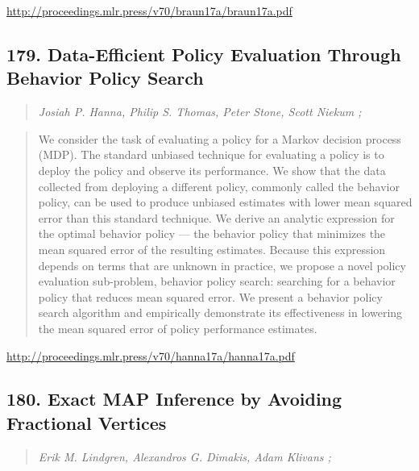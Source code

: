 \documentclass{article}
\begin{document}
\href{http://proceedings.mlr.press/v70/braun17a/braun17a.pdf}{http://proceedings.mlr.press/v70/braun17a/braun17a.pdf}

\subsection{179. Data-Efficient Policy Evaluation Through Behavior Policy Search}

\begin{quote}
\footnotesize{\textit{Josiah P. Hanna, Philip S. Thomas, Peter Stone, Scott Niekum ;}}

\end{quote}

\begin{quote}
    We consider the task of evaluating a policy for a Markov decision process (MDP). The standard unbiased technique for evaluating a policy is to deploy the policy and observe its performance. We show that the data collected from deploying a different policy, commonly called the behavior policy, can be used to produce unbiased estimates with lower mean squared error than this standard technique. We derive an analytic expression for the optimal behavior policy — the behavior policy that minimizes the mean squared error of the resulting estimates. Because this expression depends on terms that are unknown in practice, we propose a novel policy evaluation sub-problem, behavior policy search: searching for a behavior policy that reduces mean squared error. We present a behavior policy search algorithm and empirically demonstrate its effectiveness in lowering the mean squared error of policy performance estimates.  
\end{quote}

\href{http://proceedings.mlr.press/v70/hanna17a/hanna17a.pdf}{http://proceedings.mlr.press/v70/hanna17a/hanna17a.pdf}

\subsection{180. Exact MAP Inference by Avoiding Fractional Vertices}

\begin{quote}
\footnotesize{\textit{Erik M. Lindgren, Alexandros G. Dimakis, Adam Klivans ;}}

\end{quote}
\end{document}
